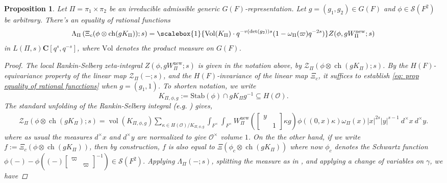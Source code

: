\documentclass{amsart}
\theoremstyle{plain}
\newtheorem{prop}[thm]{Proposition}
\newcommand\scalemath[2]{\scalebox{#1}{\mbox{\ensuremath{\displaystyle #2}}}}
\theoremstyle{plain}
\theoremstyle{remark}
\DeclareMathOperator{\ch}{ch}
\DeclareMathOperator{\vol}{vol}
\begin{document}
\begin{prop}\label{prop lambda and zeta}
    Let $\Pi=\pi_1\times\pi_2$ be an irreducible admissible generic $G(F)$-representation. Let $g=(g_1,g_2)\in G(F)$ and $\phi\in\mathcal{S}(F^2)$ be arbitrary. There's an equality of rational functions
    \begin{align}\label{eq: prop equality of rational funcctions}\Lambda_\Pi\left(\Xi_c(\phi\otimes \ch(gK_\Pi));s\right)=\scalemath{1}{\mathrm{Vol}(K_\Pi)\cdot q^{-v(\det(g_2))s}(1-\omega_\Pi(\varpi)q^{-2s})} Z(\phi,gW_\Pi^\mathrm{new};s)\end{align}
    in $L(\Pi,s)\mathbf{C}[q^s,q^{-s}]$,
    where $\mathrm{Vol}$ denotes the product measure on $G(F)$.
    \begin{proof}
        The local Rankin-Selberg zeta-integral $Z(\phi,gW_\Pi^\mathrm{new};s)$ is given in the notation above, by $\mathcal{Z}_\Pi(\phi \otimes \ch(gK_\Pi);s)$. By the $H(F)$-equivariance property of the linear map $\mathcal{Z}_\Pi(-;s)$, and the $H(F)$-invariance of the linear map $\Xi_c$, it suffices to establish \eqref{eq: prop equality of rational funcctions} when $g=(g_1,1)$. To shorten notation, we write $$K_{\Pi,\phi,g}:=\mathrm{Stab}(\phi)\cap gK_\Pi g^{-1}\subseteq H(\mathcal{O}).$$ The standard unfolding of the Rankin-Selberg integral \textcolor{black}{(e.g. \cite[Page $14$]{automorphic_on_GL_II})} gives,
        \begin{align}\label{eq: 5} {\mathcal{Z}_\Pi(\phi\otimes\ch(gK_\Pi);s)=\vol(K_{\Pi,\phi,g})\sum_{\kappa\in H(\mathcal{O})/K_{\Pi,\phi,g}}\int_{F^\times}\int_{F^\times} W_\Pi^\mathrm{new}(\left[\begin{smallmatrix}
            y & \\
            & 1
        \end{smallmatrix}\right]\kappa g) \phi((0,x)\kappa) \omega_\Pi(x)|x|^{2s} |y|^{s-1}\ d^\times x\ d^\times y.}
        \end{align}
        where as usual the measures $d^\times x$ and $d^\times y$ are normalized to give $\mathcal{O}^\times$ volume $1$.
        On the the other hand, if we write $f:=\Xi_c(\phi\otimes \ch(gK_\Pi))$, then by construction, $f$ is also equal to $\Xi(\phi_c \otimes \ch(gK_\Pi))$ where now $\phi_c$ denotes the Schwartz function $\phi(-)-\phi((-)\left[\begin{smallmatrix}
            \varpi & \\
            & \varpi
        \end{smallmatrix}\right]^{-1})\in\mathcal{S}(F^2)$. Applying $\Lambda_\Pi(-;s)$, splitting the measure as in \cite[Lemma $4.1.1$]{groutides2024rankinselbergintegralstructureseuler}, and applying a change of variables on $\gamma$, we have 

\end{proof}
\end{prop}
\end{document}
